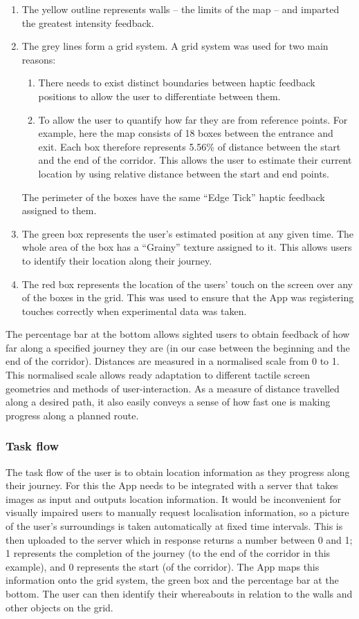 \begin{enumerate}
  \item The yellow outline represents walls -- the limits of the map -- and imparted the greatest intensity feedback.
  \item The grey lines form a grid system. A grid system was used for two main reasons:
  \begin{enumerate}
  \item There needs to exist distinct boundaries between haptic feedback positions to allow the user to differentiate between them.
  \item To allow the user to quantify how far they are from reference points. For example, here the map consists of 18 boxes between the entrance and exit. Each box therefore represents 5.56\% of distance between the start and the end of the corridor. This allows the user to estimate their current location by using relative distance between the start and end points.
  \end{enumerate}
  The perimeter of the boxes have the same ``Edge Tick'' haptic feedback assigned to them.
  \item The green box represents the user's estimated position at any given time. The whole area of the box has a ``Grainy'' texture assigned to it. This allows users to identify their location along their journey.
  \item The red box represents the location of the users' touch on the screen over any of the boxes in the grid. This was used to ensure that the App was registering touches correctly when experimental data was taken.
\end{enumerate} 

The percentage bar at the bottom allows sighted users to obtain feedback of how far along a specified journey they are (in our case between the beginning and the end of the corridor). Distances are measured in a normalised scale from 0 to 1. This normalised scale allows ready adaptation to different tactile screen geometries and methods of user-interaction. As a measure of distance travelled along a desired path, it also easily conveys a sense of how fast one is making progress along a planned route.


\subsubsection{Task flow}
\label{sec:task_flow}
The task flow of the user is to obtain location information as they progress along their journey. For this the App needs to be integrated with a server that takes images as input and outputs location information. It would be inconvenient for visually impaired users to manually request localisation information, so a picture of the user's surroundings is taken automatically at fixed time intervals. This is then uploaded to the server which in response returns a number between 0 and 1; 1 represents the completion of the journey (to the end of the corridor in this example), and 0 represents the start (of the corridor). The App maps this information onto the grid system, the green box and the percentage bar at the bottom. The user can then identify their whereabouts in relation to the walls and other objects on the grid.
 
